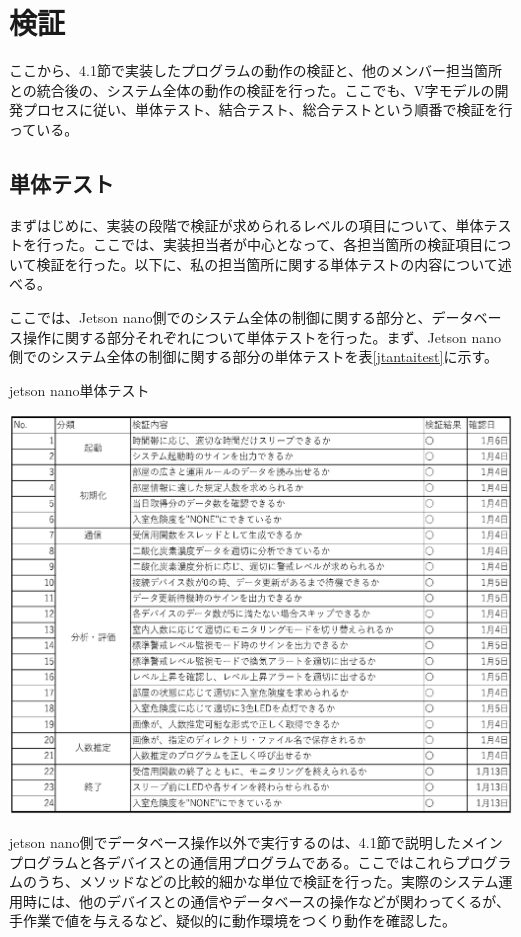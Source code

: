 \section{検証}
ここから、4.1節で実装したプログラムの動作の検証と、他のメンバー担当箇所との統合後の、システム全体の動作の検証を行った。ここでも、V字モデルの開発プロセスに従い、単体テスト、結合テスト、総合テストという順番で検証を行っている。

\subsection{単体テスト}
まずはじめに、実装の段階で検証が求められるレベルの項目について、単体テストを行った。ここでは、実装担当者が中心となって、各担当箇所の検証項目について検証を行った。以下に、私の担当箇所に関する単体テストの内容について述べる。

ここでは、Jetson nano側でのシステム全体の制御に関する部分と、データベース操作に関する部分それぞれについて単体テストを行った。まず、Jetson nano側でのシステム全体の制御に関する部分の単体テストを表\ref{jtantaitest}に示す。

\begin{table}[H]
	\centering
	\caption{jetson nano単体テスト}
	\includegraphics[width=15cm]{jtantaitest.eps}
	\label{jtantaitest}
\end{table}

jetson nano側でデータベース操作以外で実行するのは、4.1節で説明したメインプログラムと各デバイスとの通信用プログラムである。ここではこれらプログラムのうち、メソッドなどの比較的細かな単位で検証を行った。実際のシステム運用時には、他のデバイスとの通信やデータベースの操作などが関わってくるが、手作業で値を与えるなど、疑似的に動作環境をつくり動作を確認した。


